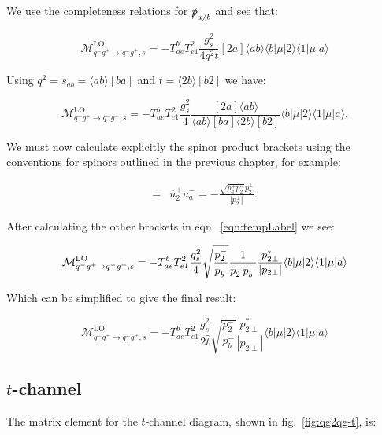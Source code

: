 		We use the completeness relations for $\slashed p_{a/b}$ and see that:

		\begin{equation}
			\mathcal{M}_{q^-g^+\to q^-g^+, s}^{\text{LO}}=-T^b_{ae}T^2_{e1}\frac{g^2_s}{4q^2t}[2a]\langle ab\rangle\langle{b}|\mu|2\rangle\langle{1}|\mu|a\rangle
		\end{equation}

		Using $q^2=s_{ab}=\langle ab\rangle[ba]$ and $t=\langle2b\rangle[b2]$ we have:

		\begin{equation}
		\mathcal{M}_{q^-g^+\to q^-g^+, s}^{\text{LO}}=-T^b_{ae}T^2_{e1}\frac{g^2_s}{4}\frac{[2a]\langle ab\rangle}{\langle ab\rangle[ba]
		\langle2b\rangle[b2]}\langle{b}|\mu|2\rangle\langle{1}|\mu|a\rangle.
		\label{eqn:tempLabel}
		\end{equation}

		We must now calculate explicitly the spinor product brackets using the conventions for spinors outlined in the
		previous chapter, for example:

		\begin{align}
			[2a] = &\overline{u}^+_2u^-_a=-\frac{\sqrt{p_a^+p_2^-}p_2^\perp}{|p_2^\perp|}.
		\end{align}

		After calculating the other brackets in eqn.~\eqref{eqn:tempLabel} we see:

		\begin{equation}
			\mathcal{M}_{q^-g^+\to q^-g^+, s}^{\text{LO}} = -T^b_{ae}T^2_{e1}\frac{g_s^2}{4}\sqrt{\frac{p_2^-}{p_b^-}}\frac{1}{p_2^+p_b^-} \frac{p_{2\perp}^*}{|p_{2\perp}|} \langle b | \mu | 2 \rangle \langle 1 | \mu | a \rangle
		\end{equation}

		Which can be simplified to give the final result:

		\begin{equation}
			\mathcal{M}_{q^-g^+\to q^-g^+, s}^{\text{LO}}=-T^b_{ae}T^2_{e1}\frac{g_s^2}{2\hat{t}}\sqrt{\frac{p_2^-}{p_b^-}}\frac{p_{2\perp}^*}
			{|p_{2\perp}|}\langle{b}|\mu|2\rangle\langle{1}|\mu|a\rangle
			\label{eqn:s-channel}
		\end{equation}

	\subsection{$t$-channel}

		The matrix element for the $t$-channel diagram, shown in fig.~\eqref{fig:qg2qg-t}, is:

